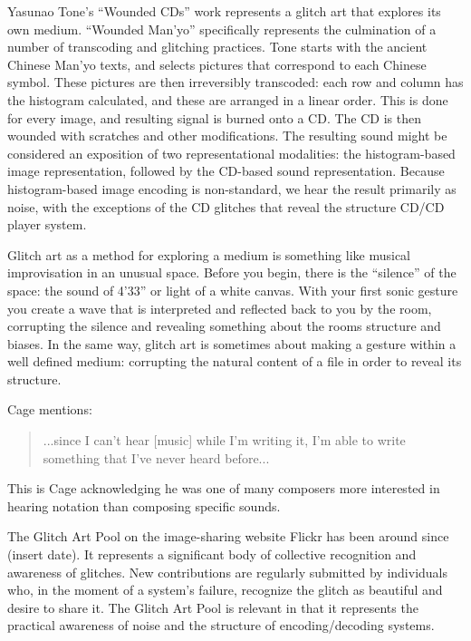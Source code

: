 \documentclass{thesis}
\begin{document}
	\cite{media_art_net_media_2010}
	Yasunao Tone's ``Wounded CDs'' work represents a glitch art that explores its own medium. ``Wounded Man'yo'' specifically represents the culmination of a number of transcoding and glitching practices. Tone starts with the ancient Chinese Man'yo texts, and selects pictures that correspond to each Chinese symbol. These pictures are then irreversibly transcoded: each row and column has the histogram calculated, and these are arranged in a linear order. This is done for every image, and resulting signal is burned onto a CD. The CD is then wounded with scratches and other modifications. The resulting sound might be considered an exposition of two representational modalities: the histogram-based image representation, followed by the CD-based sound representation. Because histogram-based image encoding is non-standard, we hear the result primarily as noise, with the exceptions of the CD glitches that reveal the structure CD/CD player system.
	
	Glitch art as a method for exploring a medium is something like musical improvisation in an unusual space. Before you begin, there is the ``silence'' of the space: the sound of 4'33'' or light of a white canvas. With your first sonic gesture you create a wave that is interpreted and reflected back to you by the room, corrupting the silence and revealing something about the rooms structure and biases. In the same way, glitch art is sometimes about making a gesture within a well defined medium: corrupting the natural content of a file in order to reveal its structure.
	
	Cage mentions:

\begin{quote}
...since I can't hear [music] while I'm writing it, I'm able to write something that I've never heard before...
\end{quote}

	This is Cage acknowledging he was one of many composers more interested in hearing notation than composing specific sounds.

	\cite{liminalmike_flickr:glitch_????}
	The Glitch Art Pool on the image-sharing website Flickr has been around since (insert date). It represents a significant body of collective recognition and awareness of glitches. New contributions are regularly submitted by individuals who, in the moment of a system's failure, recognize the glitch as beautiful and desire to share it. The Glitch Art Pool is relevant in that it represents the practical awareness of noise and the structure of encoding/decoding systems.
	
\end{document}
